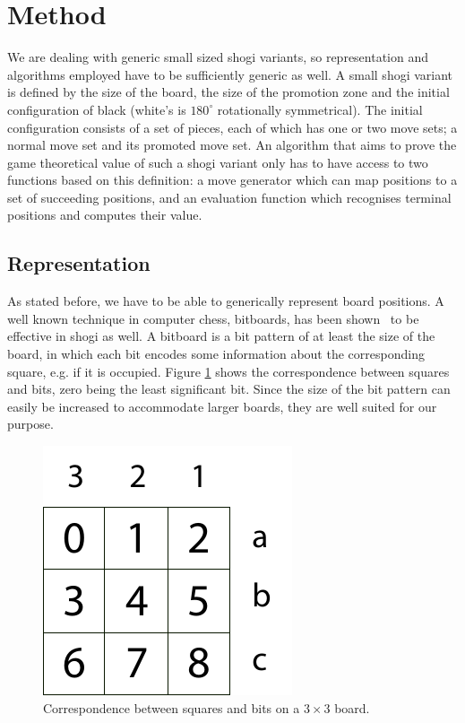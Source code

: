 \documentclass[a4paper, 11pt]{article}
\begin{document}
\section{Method}
We are dealing with generic small sized shogi variants, so representation and algorithms employed have to be sufficiently generic as well.
A small shogi variant is defined by the size of the board, the size of the promotion zone and the initial configuration of black (white's is $180^{\circ}$ rotationally symmetrical). The initial configuration consists of a set of pieces, each of which has one or two move sets; a normal move set and
its promoted move set. An algorithm that aims to prove the game theoretical value of such a shogi variant only has to have access to two functions based on this
definition: a move generator which can map positions to a set of succeeding positions, and an evaluation function which recognises terminal
positions and computes their value.

\subsection{Representation}
\label{sec:rep}
As stated before, we have to be able to generically represent board positions. A well known technique in computer chess, bitboards, has been
shown~\cite{grimbergen2007using} to be effective in shogi as well. A bitboard is a bit pattern of at least the size of the board,
in which each bit encodes some information about the corresponding square, e.g. if it is occupied.
Figure \ref{bitsquares} shows the correspondence between squares and bits, zero being the least significant bit.
Since the size of the bit pattern can
easily be increased to accommodate larger boards, they are well suited for our purpose.

\begin{figure}
\center
\includegraphics{bitsquares.pdf}
\caption{Correspondence between squares and bits on a $3 \times 3$ board.}
\label{bitsquares}
\end{figure}
\end{document}
